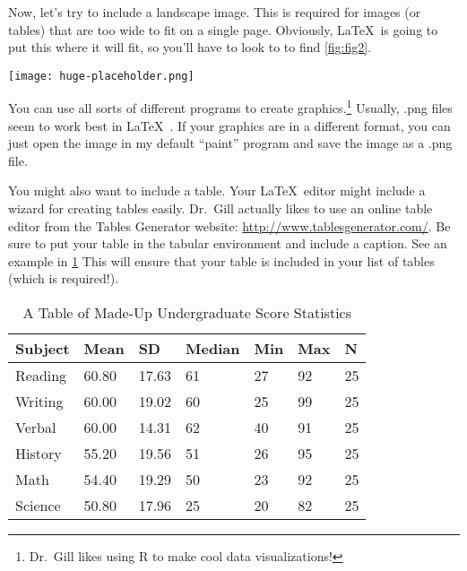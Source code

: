 Now, let's try to include a landscape image. This is required for images (or tables) that are too wide to fit on a single page. Obviously, \LaTeX\ is going to put this where it will fit, so you'll have to look to  to find \cref{fig:fig2}.

\begin{sidewaysfigure}
	\centering
	\caption{This is a Landscape Figure}
		\label{fig:fig2}
			\texttt{[image: huge-placeholder.png]}
\end{sidewaysfigure}

You can use all sorts of different programs to create graphics.\footnote{Dr.\ Gill likes using \textsf{R} to make cool data visualizations!} Usually, .png files seem to work best in \LaTeX\ . If your graphics are in a different format, you can just open the image in my default ``paint'' program and save the image as a .png file. 

You might also want to include a table. Your \LaTeX\ editor might include a wizard for creating tables easily. Dr.\ Gill actually likes to use an online table editor from the Tables Generator website: \url{http://www.tablesgenerator.com/}. Be sure to put your table in the tabular environment and include a caption. See an example in \cref{sampletable} This will ensure that your table is included in your list of tables (which is required!). 

\begin{table}[htbp]
	\begin{singlespace} %
	\center %
\caption{A Table of Made-Up Undergraduate Score Statistics}
\label{sampletable}
\begin{tabular}{lllllll} \toprule
Subject & Mean  & SD    & Median & Min & Max & N  \\ \midrule
Reading & 60.80 & 17.63 & 61     & 27  & 92  & 25 \\
Writing & 60.00 & 19.02 & 60     & 25  & 99  & 25 \\
Verbal  & 60.00 & 14.31 & 62     & 40  & 91  & 25 \\
History & 55.20 & 19.56 & 51     & 26  & 95  & 25 \\
Math    & 54.40 & 19.29 & 50     & 23  & 92  & 25 \\
Science & 50.80 & 17.96 & 25     & 20  & 82  & 25 \\
\bottomrule
\end{tabular}
\end{singlespace}
\end{table}

